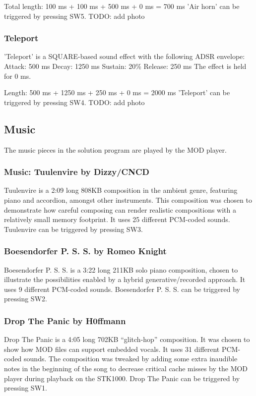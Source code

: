 Total length: 100 ms + 100 ms + 500 ms + 0 ms = 700 ms
'Air horn' can be triggered by pressing SW5.
TODO: add photo

\subsubsection{Teleport}
'Teleport' is a SQUARE-based sound effect with the following ADSR envelope:
Attack: 500 ms
Decay:  1250 ms
Sustain: 20\%
Release: 250 ms
The effect is held for 0 ms.

Length: 500 ms + 1250 ms + 250 ms + 0 ms = 2000 ms
'Teleport' can be triggered by pressing SW4.
TODO: add photo


\subsection{Music}

The music pieces in the solution program are played by the MOD player.

\subsubsection{Music: Tuulenvire by Dizzy/CNCD}
Tuulenvire is a 2:09 long 808KB composition in the ambient genre, featuring piano and accordion, amongst other instruments.
This composition was chosen to demonstrate how careful composing can render realistic compositions with a relatively small memory footprint.
It uses 25 different PCM-coded sounds.
Tuulenvire can be triggered by pressing SW3.

\subsubsection{Boesendorfer P. S. S. by Romeo Knight}
Boesendorfer P. S. S. is a 3:22 long 211KB solo piano composition, chosen to illustrate the possibilities enabled by a hybrid generative/recorded approach.
It uses 9 different PCM-coded sounds.
Boesendorfer P. S. S. can be triggered by pressing SW2.

\subsubsection{Drop The Panic by H0ffmann}
Drop The Panic is a 4:05 long 702KB ``glitch-hop'' composition.
It was chosen to show how MOD files can support embedded vocals.
It uses 31 different PCM-coded sounds.
The composition was tweaked by adding some extra inaudible notes in the beginning of the song to decrease critical cache misses by the MOD player during playback on the STK1000.
Drop The Panic can be triggered by pressing SW1.

